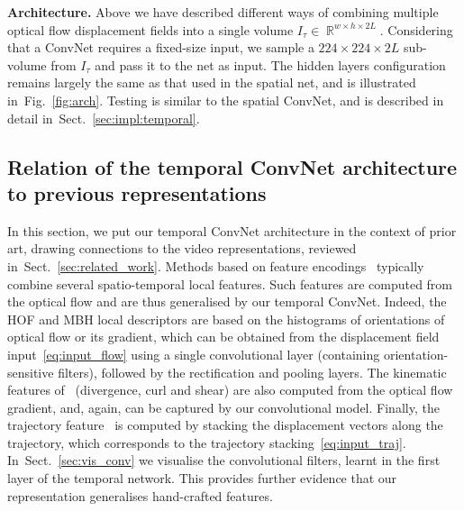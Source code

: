 \documentclass{article} %
\newcommand{\figref}[1]{Fig.~\ref{#1}}
\newcommand{\sref}[1]{Sect.~\ref{#1}}
\DeclareMathOperator{\Rbb}{\mathbb{R}}
\begin{document}
\noindent\textbf{Architecture.} Above we have described different ways of combining multiple optical flow displacement fields into a single volume $I_{\tau} \in \Rbb^{w \times h \times 2L}$.
Considering that a ConvNet requires a fixed-size input, we sample a $224\times224\times2L$ sub-volume from $I_{\tau}$ and pass it to the net as input.
The hidden layers configuration remains largely the same as 
that used in the spatial net, and is illustrated in~\figref{fig:arch}.
Testing is similar to the spatial ConvNet, and is described in detail in~\sref{sec:impl:temporal}.

\subsection{Relation of the temporal ConvNet architecture to previous representations}
\label{sec:rel}

In this section, we put our temporal ConvNet architecture in the
context of prior art, drawing connections to the video
representations, reviewed in~\sref{sec:related_work}.  Methods based
on feature encodings~\cite{Laptev08,Wang11b} typically combine several
spatio-temporal local features. Such features are computed from the
optical flow and are thus generalised by our temporal ConvNet.
Indeed, the HOF and MBH local descriptors are based on the
histograms of orientations of optical flow or its gradient, which can be obtained from
the displacement field input~\eqref{eq:input_flow} using a single
convolutional layer (containing orientation-sensitive filters),
followed by the rectification and pooling layers. 
The kinematic features of~\cite{Jain13} (divergence, curl and shear)
are also computed from the optical flow gradient, and, again, can be captured
by our convolutional model.  Finally, the trajectory
feature~\cite{Wang11b} is computed by stacking the displacement
vectors along the trajectory, which corresponds to the
trajectory stacking~\eqref{eq:input_traj}.  
In~\sref{sec:vis_conv} we visualise the convolutional filters, learnt in the first layer of the temporal network. 
This provides further evidence that our representation generalises hand-crafted features.
\end{document}
